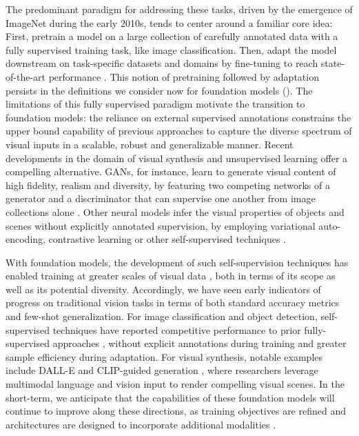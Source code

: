The predominant paradigm for addressing these tasks, driven by the emergence of ImageNet \cite{deng2009imagenet} during the early 2010s, tends to center around a familiar core idea:
First, pretrain a model on a large collection of carefully annotated data \cite{russakovsky2015imagenet} with a fully supervised training task, like image classification. Then, adapt the model downstream on task-specific datasets and domains \cite{lin2014microsoft, chen2015microsoft, antol2015vqa} by fine-tuning to reach state-of-the-art performance \cite{krizhevsky2012imagenet, simonyan2015verydeep, he2016deep, xu2016ask}.
This notion of pretraining followed by adaptation persists in the definitions we consider now for foundation models ().
The limitations of this fully supervised paradigm motivate the transition to foundation models: the reliance on external supervised annotations constrains the upper bound capability of previous approaches to capture the diverse spectrum of visual inputs in a scalable, robust and generalizable manner. 
Recent developments in the domain of visual synthesis and unsupervised learning offer a compelling alternative. GANs, for instance, learn to generate visual content of high fidelity, realism and diversity, by featuring two competing networks of a generator and a discriminator that can supervise one another from image collections alone \citep[\eg][]{goodfellow2014gan,ganformer}. Other neural models infer the visual properties of objects and scenes without explicitly annotated supervision, by employing variational auto-encoding, contrastive learning or other self-supervised techniques \citep[\eg][]{Kingma2014AutoEncodingVB, chen2020simclr, He2020MomentumCF}.

With foundation models, the development of such self-supervision techniques has enabled training at greater scales of visual data \cite{changpinyo2021cc12m}, 
both in terms of its scope as well as its potential diversity. Accordingly, we have seen early indicators of progress on traditional vision tasks in terms of both standard accuracy metrics and few-shot generalization. For image classification and object detection, self-supervised techniques have reported competitive performance to prior fully-supervised approaches \cite{he2019moco,chen2020simclr,radford2021learning,henaff2021efficient}, without explicit annotations during training and greater sample efficiency during adaptation.
For visual synthesis, notable examples include DALL-E \cite{ramesh2021zeroshot} and CLIP-guided generation \cite{radford2021learning, galatolo2021generating}, where researchers leverage multimodal language and vision input to render compelling visual scenes.
In the short-term, we anticipate that the capabilities of these foundation models will continue to improve along these directions, as training objectives are refined \cite{chen2020mocov2,henaff2021efficient,selvaraju2021casting} and architectures are designed to incorporate additional modalities \cite{jaegle2021perceiver}.

